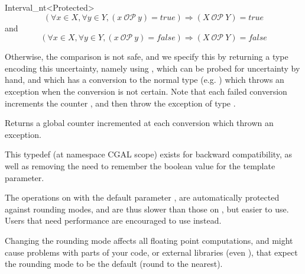 \begin{ccRefClass}{Interval_nt<Protected>}
$$
\left(\forall x \in X, \forall y \in Y, (x\ \mathcal{OP}\ y) = true\right)
\Rightarrow (X\ \mathcal{OP}\ Y) = true
$$
and
$$
\left(\forall x \in X, \forall y \in Y, (x\ \mathcal{OP}\ y) = false\right)
\Rightarrow (X\ \mathcal{OP}\ Y) =false
$$

Otherwise, the comparison is not safe, and we specify this by returning
a type encoding this uncertainty, namely using , which
can be probed for uncertainty by hand, and which has a conversion to
the normal type (e.g. ) which throws an exception when the
conversion is not certain.  Note that each failed conversion increments
the counter , and then throw the exception of
type .

\ccGlue
{}
\ccGlue
{}
\ccGlue
{}
\ccGlue
{}
\ccGlue
{}
\ccGlue
{}
\ccGlue
{}

{Returns a global counter incremented at each conversion which thrown an
exception.}

{This typedef (at namespace CGAL scope) exists for backward compatibility,
 as well as removing the need to remember the boolean value for the template
 parameter.}

\begin{ccAdvanced}

\ccImplementation

The operations on  with the default parameter ,
are automatically protected against rounding modes, and are thus slower than
those on , but easier to use.  Users that need
performance are encouraged to use  instead.

Changing the rounding mode affects all floating point computations, and might
cause problems with parts of your code, or external libraries (even \cgal),
that expect the rounding mode to be the default (round to the nearest).


\end{ccAdvanced}
\end{ccRefClass}
